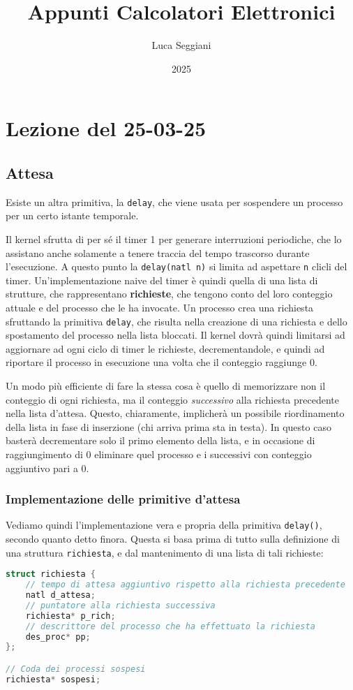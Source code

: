 \documentclass[a4paper,11pt]{article}
\title{Appunti Calcolatori Elettronici}
\author{Luca Seggiani}
\date{2025}
\begin{document}
\section{Lezione del 25-03-25}

\thispagestyle{empty}
\pagestyle{fancy}

\subsection{Attesa}
Esiste un altra primitiva, la \lstinline|delay|, che viene usata per sospendere un processo per un certo istante temporale.

Il kernel sfrutta di per sé il timer 1 per generare interruzioni periodiche, che lo assistano anche solamente a tenere traccia del tempo trascorso durante l'esecuzione.
A questo punto la \lstinline|delay(natl n)| si limita ad aspettare \lstinline|n| clicli del timer.
Un'implementazione naive del timer è quindi quella di una lista di strutture, che rappresentano \textbf{richieste}, che tengono conto del loro conteggio attuale e del processo che le ha invocate.
Un processo crea una richiesta sfruttando la primitiva \lstinline|delay|, che risulta nella creazione di una richiesta e dello spostamento del processo nella lista bloccati.
Il kernel dovrà quindi limitarsi ad aggiornare ad ogni ciclo di timer le richieste, decrementandole, e quindi ad riportare il processo in esecuzione una volta che il conteggio raggiunge 0.

Un modo più efficiente di fare la stessa cosa è quello di memorizzare non il conteggio di ogni richiesta, ma il conteggio \textit{successivo} alla richiesta precedente nella lista d'attesa.
Questo, chiaramente, implicherà un possibile riordinamento della lista in fase di inserzione (chi arriva prima sta in testa).
In questo caso basterà decrementare solo il primo elemento della lista, e in occasione di raggiungimento di 0 eliminare quel processo e i successivi con conteggio aggiuntivo pari a 0.

\subsubsection{Implementazione delle primitive d'attesa}
Vediamo quindi l'implementazione vera e propria della primitiva \lstinline|delay()|, secondo quanto detto finora.
Questa si basa prima di tutto sulla definizione di una struttura \lstinline|richiesta|, e dal mantenimento di una lista di tali richieste:
\begin{lstlisting}[language=C++, style=codestyle]	
struct richiesta {
	// tempo di attesa aggiuntivo rispetto alla richiesta precedente
	natl d_attesa;
	// puntatore alla richiesta successiva
	richiesta* p_rich;
	// descrittore del processo che ha effettuato la richiesta
	des_proc* pp;
};

// Coda dei processi sospesi
richiesta* sospesi;
\end{lstlisting}
\end{document}
